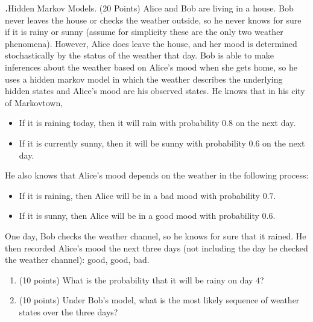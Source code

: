\documentclass[12pt]{amsart}
\newenvironment{statement}[1]{\smallskip\noindent\color[rgb]{0.0,0.0,0.0} {\bf #1.}}{}
\newcommand{\1}{\mathds{1}}
\begin{document}
\newpage

\begin{statement}{4}
\textit{Hidden Markov Models.} (20 Points) Alice and Bob are living in a house. Bob never leaves the house or checks the weather outside, so he never knows for sure if it is rainy or sunny (assume for simplicity these are the only two weather phenomena).
However, Alice does leave the house, and her mood is determined stochastically by the status of the weather that day.
Bob is able to make inferences about the weather based on Alice's mood when she gets home, so he uses a hidden markov model in which the weather describes the underlying hidden states and Alice's mood are his observed states. He knows that in his city of Markovtown, 
\begin{itemize}
    \item If it is raining today, then it will rain with probability $0.8$ on the next day.
    \item If it is currently sunny, then it will be sunny with probability $0.6$ on the next day.
\end{itemize}
He also knows that Alice's mood depends on the weather in the following process:
\begin{itemize}
    \item If it is raining, then Alice will be in a bad mood with probability $0.7$.
    \item If it is sunny, then Alice will be in a good mood with probability $0.6$.
\end{itemize}
One day, Bob checks the weather channel, so he knows for sure that it rained. He then recorded Alice's mood the next three days (not including the day he checked the weather channel): good, good, bad.
\begin{enumerate}
    \item (10 points) What is the probability that it will be rainy on day $4$?
    \item (10 points) Under Bob's model, what is the most likely sequence of weather states over the three days?
\end{enumerate}
\end{statement}

\newpage
\end{document}
